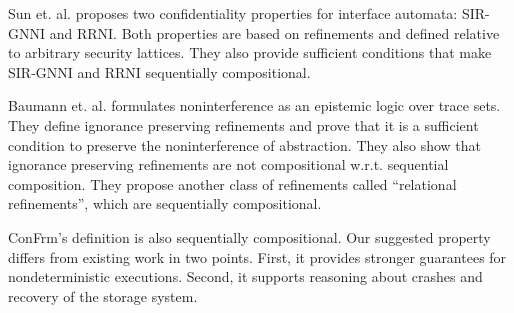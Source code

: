  
Sun et. al. \cite{sun} proposes two confidentiality properties for interface automata: SIR-GNNI and RRNI. Both properties are based on refinements and defined relative to arbitrary security lattices. They also provide sufficient conditions that make SIR-GNNI and RRNI sequentially compositional. 

Baumann et. al. \cite{baumann} formulates noninterference as an epistemic logic over trace sets. They define ignorance preserving refinements and prove that it is a sufficient condition to preserve the noninterference of abstraction. They also show that ignorance preserving refinements are not compositional w.r.t. sequential composition. They propose another class of refinements called “relational refinements”, which are sequentially compositional. 


ConFrm’s definition is also sequentially compositional. Our suggested property differs from existing work in two points. First, it provides stronger guarantees for nondeterministic executions. Second, it supports reasoning about crashes and recovery of the storage system. 


	
	
	
	
